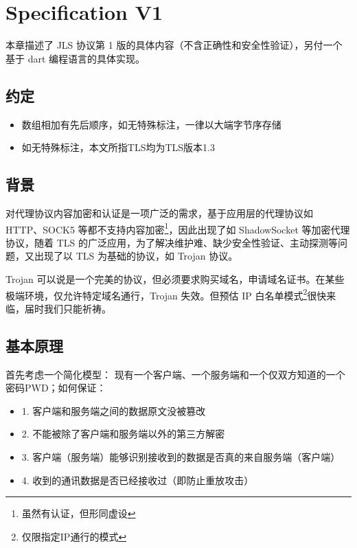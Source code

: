 
\chapter{Specification V1}
本章描述了 JLS 协议第 1 版的具体内容（不含正确性和安全性验证），另付一个基于 dart 编程语言的具体实现。

\section{约定}
\begin{itemize}
	\item 数组相加有先后顺序，如无特殊标注，一律以大端字节序存储
	\item 如无特殊标注，本文所指TLS均为TLS版本1.3
\end{itemize}

\section{背景}

对代理协议内容加密和认证是一项广泛的需求，基于应用层的代理协议如 HTTP、SOCK5 等都不支持内容加密\footnote{虽然有认证，但形同虚设}，因此出现了如 ShadowSocket 等加密代理协议，随着 TLS 的广泛应用，为了解决维护难、缺少安全性验证、主动探测等问题，又出现了以 TLS 为基础的协议，如 Trojan 协议。

Trojan 可以说是一个完美的协议，但必须要求购买域名，申请域名证书。在某些极端环境，仅允许特定域名通行，Trojan 失效。但预估 IP 白名单模式\footnote{仅限指定IP通行的模式}很快来临，届时我们只能祈祷。


\section{基本原理}

首先考虑一个简化模型：
现有一个客户端、一个服务端和一个仅双方知道的一个密码PWD；如何保证：\newline
\begin{itemize}
	\item 1. 客户端和服务端之间的数据原文没被篡改
	\item 2. 不能被除了客户端和服务端以外的第三方解密
	\item 3. 客户端（服务端）能够识别接收到的数据是否真的来自服务端（客户端）
	\item 4. 收到的通讯数据是否已经接收过（即防止重放攻击）\newline
\end{itemize}

